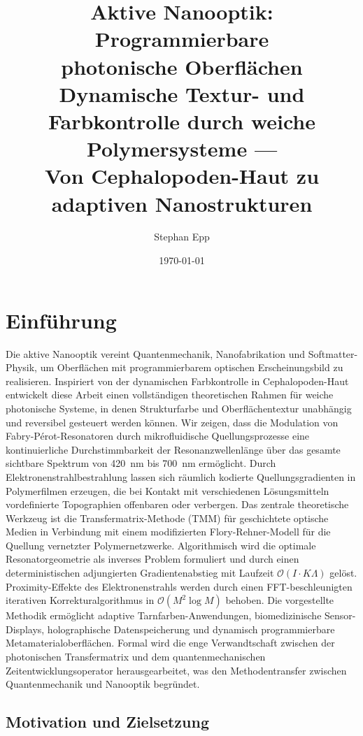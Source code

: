 ﻿\documentclass[a4paper,12pt]{article}
\title{\textbf{Aktive Nanooptik: Programmierbare\\ photonische Oberflächen} \\ [0.8ex]
	\large Dynamische Textur- und Farbkontrolle durch weiche Polymersysteme ---\\
	Von Cephalopoden-Haut zu adaptiven Nanostrukturen}
\author{Stephan Epp}
\date{\today}
\theoremstyle{definition}
\newcommand{\ordre}[1]{\mathcal{O}\!\left(#1\right)}
\begin{document}
	
	\maketitle
	
	\tableofcontents
	\newpage
	
	\section{Einführung}
	\label{sec:einfuehrung}
	Die aktive Nanooptik vereint Quantenmechanik, Nanofabrikation und Soft\-matter-Physik,
	um Oberflächen mit programmierbarem optischen Erscheinungsbild zu realisieren.
	Inspiriert von der dynamischen Farbkontrolle in Cephalopoden-Haut entwickelt diese
	Arbeit einen vollständigen theoretischen Rahmen für weiche photonische Systeme,
	in denen Strukturfarbe und Oberflächentextur unabhängig und reversibel gesteuert
	werden können.
	Wir zeigen, dass die Modulation von Fabry-Pérot-Resonatoren durch mikrofluidische
	Quellungsprozesse eine kontinuierliche Durchstimmbarkeit der Resonanzwellenlänge
	über das gesamte sichtbare Spektrum von \SI{420}{nm} bis \SI{700}{nm} ermöglicht.
	Durch Elektronenstrahlbestrahlung lassen sich räumlich kodierte Quellungsgradienten
	in Polymerfilmen erzeugen, die bei Kontakt mit verschiedenen Lösungsmitteln
	vordefinierte Topographien offenbaren oder verbergen.
	Das zentrale theoretische Werkzeug ist die Transfermatrix-Methode (TMM) für
	geschichtete optische Medien in Verbindung mit einem modifizierten Flory-Rehner-Modell
	für die Quellung vernetzter Polymernetzwerke.
	Algorithmisch wird die optimale Resonatorgeometrie als inverses Problem formuliert
	und durch einen deterministischen adjungierten Gradientenabstieg mit
	Laufzeit $\ordre{I \cdot K\Lambda}$ gelöst.
	Proximity-Effekte des Elektronenstrahls werden durch einen FFT-beschleunigten
	iterativen Korrekturalgorithmus in $\ordre{M^2 \log M}$ behoben.
	Die vorgestellte Methodik ermöglicht adaptive Tarnfarben-Anwendungen,
	biomedizinische Sensor-Displays, holographische Datenspeicherung und dynamisch
	programmierbare Metamaterialoberflächen.
	Formal wird die enge Verwandtschaft zwischen der photonischen Transfermatrix und
	dem quantenmechanischen Zeitentwicklungsoperator herausgearbeitet, was den
	Methodentransfer zwischen Quantenmechanik und Nanooptik begründet.
	
	\subsection{Motivation und Zielsetzung}
	
\end{document}
